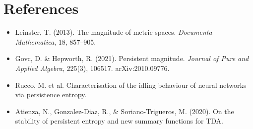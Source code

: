 \documentclass[11pt]{article}
\begin{document}
\section*{References}
\begin{itemize}
  \item[] Leinster, T. (2013). The magnitude of metric spaces. \emph{Documenta Mathematica}, 18, 857--905.
  \item[] Govc, D. \& Hepworth, R. (2021). Persistent magnitude. \emph{Journal of Pure and Applied Algebra}, 225(3), 106517. arXiv:2010.09776.
  \item[] Rucco, M. et al. Characterisation of the idling behaviour of neural networks via persistence entropy.
  \item[] Atienza, N., Gonzalez-Diaz, R., \& Soriano-Trigueros, M. (2020). On the stability of persistent entropy and new summary functions for TDA.
\end{itemize}
\end{document}
